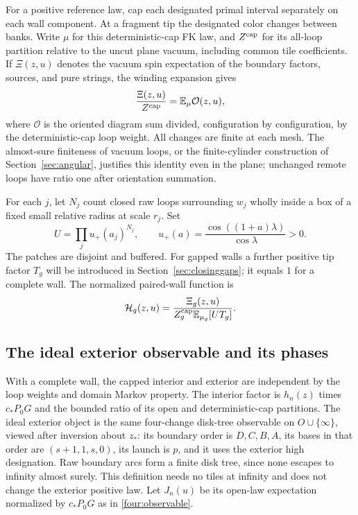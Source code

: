 For a positive reference law, cap each designated primal interval
separately on each wall component.  At a fragment tip the designated
color changes between banks.  Write $\mu$ for this deterministic-cap
FK law, and $Z^{\rm cap}$ for its all-loop partition relative to the
uncut plane vacuum, including common tile coefficients.  If
$\Xi(z,u)$ denotes the vacuum spin expectation of the boundary factors,
sources, and pure strings, the winding expansion gives
\begin{equation}
 \frac{\Xi(z,u)}{Z^{\rm cap}}
       =\mathbb E_\mu\mathcal O(z,u),
 \label{wall:diagram-normalization}
\end{equation}
where $\mathcal O$ is the oriented diagram sum divided, configuration
by configuration, by the deterministic-cap loop weight.  All changes
are finite at each mesh.  The almost-sure finiteness of vacuum loops,
or the finite-cylinder construction of Section~\ref{sec:angular},
justifies this identity even in the plane; unchanged remote loops have
ratio one after orientation summation.

For each $j$, let $N_j$ count closed raw loops surrounding $w_j$ wholly
inside a box of a fixed small relative radius at scale $r_j$.  Set
\begin{equation}
 U=\prod_j u_+(a_j)^{N_j},\qquad
 u_+(a)=\frac{\cos((1+a)\lambda)}{\cos\lambda}>0.
 \label{wall:U}
\end{equation}
The patches are disjoint and buffered.  For gapped walls a further
positive tip factor $T_g$ will be introduced in
Section~\ref{sec:closinggaps}; it equals $1$ for a complete wall.
The normalized paired-wall function is
\begin{equation}
 \mathcal H_g(z,u)=
 \frac{\Xi_g(z,u)}{Z_g^{\rm cap}\mathbb E_{\mu_g}[UT_g]}.
 \label{wall:H-normalized}
\end{equation}

\subsection{The ideal exterior observable and its phases}

With a complete wall, the capped interior and exterior are independent
by the loop weights and domain Markov property.  The interior factor
is $h_n(z)$ times $c_*P_0G$ and the bounded ratio of its open and
deterministic-cap partitions.  The ideal exterior object is the same
four-change disk-tree observable on $O\cup\{\infty\}$, viewed after
inversion about $z_*$: its boundary order is $D,C,B,A$, its bases in
that order are $(s+1,1,s,0)$, its launch is $p$, and it uses the exterior
high designation.  Raw boundary arcs form a finite disk tree, since
none escapes to infinity almost surely.  This definition needs no
tiles at infinity and does not change the exterior positive law.
Let $J_n(u)$ be its open-law expectation normalized by $c_*P_0G$
as in \eqref{four:observable}.

